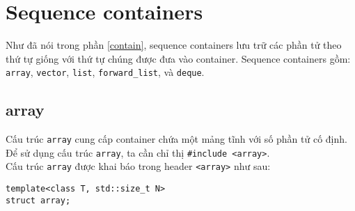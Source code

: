 \section{Sequence containers}
\label{seqcon}
Như đã nói trong phần \ref{contain}, sequence containers lưu trữ các phần tử theo thứ tự giống với thứ tự chúng được đưa vào container. Sequence containers gồm: \lstinline{array}, \lstinline{vector}, \lstinline{list}, \lstinline{forward_list}, và \lstinline{deque}. 
\subsection{array}
Cấu trúc \lstinline{array} cung cấp container chứa một mảng tĩnh với số phần tử cố định. \\
Để sử dụng cấu trúc \lstinline{array}, ta cần chỉ thị \lstinline{#include <array>}.\\
Cấu trúc \lstinline{array} được khai báo trong header \lstinline{<array>} như sau:\cite{array}
\begin{lstlisting}
template<class T, std::size_t N>
struct array;
\end{lstlisting}
